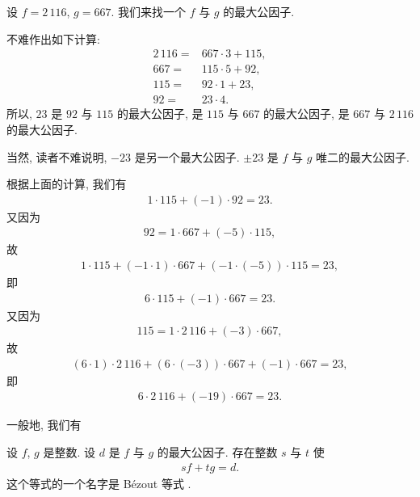 \begin{example}
    设 $f = 2\,116$, $g = 667$. 我们来找一个 $f$ 与 $g$ 的最大公因子.

    不难作出如下计算:
    \begin{align*}
        2\,116 = {} & 667 \cdot 3 + 115, \\
        667    = {} & 115 \cdot 5 + 92,  \\
        115    = {} & 92 \cdot 1 + 23,   \\
        92     = {} & 23 \cdot 4.
    \end{align*}
    所以, $23$ 是 $92$ 与 $115$ 的最大公因子, 是 $115$ 与 $667$ 的最大公因子, 是 $667$ 与 $2\,116$ 的最大公因子.

    当然, 读者不难说明, $-23$ 是另一个最大公因子. $\pm 23$ 是 $f$ 与 $g$ 唯二的最大公因子.
\end{example}

根据上面的计算, 我们有
\begin{align*}
    1 \cdot 115 + (-1) \cdot 92 = 23.
\end{align*}
又因为
\begin{align*}
    92 = 1 \cdot 667 + (-5) \cdot 115,
\end{align*}
故
\begin{align*}
    1 \cdot 115 + (-1 \cdot 1) \cdot 667 + (-1 \cdot (-5)) \cdot 115 = 23,
\end{align*}
即
\begin{align*}
    6 \cdot 115 + (-1) \cdot 667 = 23.
\end{align*}
又因为
\begin{align*}
    115 = 1 \cdot 2\,116 + (-3) \cdot 667,
\end{align*}
故
\begin{align*}
    (6 \cdot 1) \cdot 2\,116 + (6 \cdot (-3)) \cdot 667 + (-1) \cdot 667 = 23,
\end{align*}
即
\begin{align*}
    6 \cdot 2\,116 + (-19) \cdot 667 = 23.
\end{align*}

一般地, 我们有
\begin{proposition}
    设 $f$, $g$ 是整数. 设 $d$ 是 $f$ 与 $g$ 的最大公因子. 存在整数 $s$ 与 $t$ 使
    \begin{align*}
        sf + tg = d.
    \end{align*}
    这个等式的一个名字是 Bézout 等式 .
\end{proposition}

